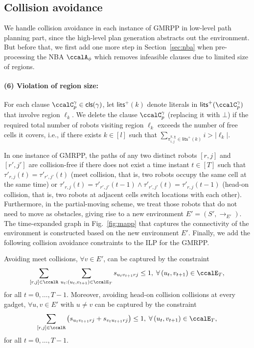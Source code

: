 \documentclass[Afour,sageh,times]{sagej}
\newcommand{\clause}[1]{\mathsf{cls}(#1)}
\newcommand{\cp}[2]{\ccalC_{#1}^{#2}}
\newcommand{\autop}{\ccalA_{\phi}}
\renewcommand{\ap}[3]{\mathcal{\pi}_{{#1},{#2}}^{#3}}
\begin{document}
{ \subsection{Collision avoidance}\label{sec:extension_collision}
We handle collision avoidance in each instance of GMRPP in low-level path planning part,  since the high-level plan generation abstracts out the environment.  But before that, we first add one more step in Section~\ref{sec:nba} when pre-processing the NBA $\autop$ which removes infeasible clauses due to limited size of regions.
\paragraph{(6) Violation of region size:} \label{prune:violation2} For each clause $\cp{p}{\gamma} \in \clause{\gamma}$, let $\mathsf{lits}^+(k)$ denote literals in $\mathsf{lits}^+(\cp{p}{\gamma})$ that involve region $\ell_{k}$. We delete the clause $\cp{p}{\gamma}$ (replacing it with $\bot$) if the required total number of robots  visiting region $\ell_{k}$ exceeds the number of free cells it covers, i.e., if there exists $k\in[l]$ such that $ \sum_{\ap{i}{j}{k,\chi}\in\mathsf{lits}^+(k)}   i > |\ell_k|$.

In one instance of GMRPP, the paths of  any two distinct robots $[r,j]$ and $[r', j']$ are collision-free if there does not exist  a time instant $t \in [T]$ such that $\tau'_{r,j}(t) = \tau'_{r',j'}(t)$ (meet collision, that is, two robots occupy the same cell at the same time) or  $\tau'_{r,j}(t) = \tau'_{r',j'}(t-1) \wedge \tau'_{r',j'}(t) = \tau'_{r,j}(t-1)$ (head-on collision, that is, two robots at adjacent cells switch locations with each other). Furthermore, in the partial-moving scheme, we treat those robots that do not need to move  as obstacles, giving rise to a new environment $E'=(S', \to_{E'})$. The time-expanded graph in Fig.~\ref{fig:mapp} that captures the connectivity of the environment is constructed based on the new environment $E'$. Finally, we add the following collision avoidance constraints to the ILP for the GMRPP.

Avoiding meet collisions,  $\forall v \in E'$, can be captured by the constraint
\begingroup\makeatletter\def\f@size{10}\check@mathfonts
\def\maketag@@@#1{\hbox{\m@th\normalsize\normalfont#1}}%
\begin{align}\label{eq:meet}
 \sum_{[r,j]\in\ccalR}  \, \sum_{u_t: (u_t, v_{t+1}) \in \ccalE_T} s_{u_t v_{t+1} r j } \leq 1,  \; \forall \,(u_t, v_{t+1}) \in \ccalE_T,
\end{align}
\endgroup
for all $t=0,\ldots,T-1$. Moreover, avoiding head-on collision collisions at every  gadget, $\forall u, v \in E'$ with $u\not= v$ can be captured by the constraint
\begingroup\makeatletter\def\f@size{10}\check@mathfonts
\def\maketag@@@#1{\hbox{\m@th\normalsize\normalfont#1}}%
\begingroup
\begin{align}\label{eq:headon}
 \sum_{[r,j]\in \ccalR} \left( s_{u_t v_{t+1} r j } + s_{v_t u_{t+1} r j } \right) \leq 1, \; \forall \,(u_t, v_{t+1}) \in \ccalE_T,
\end{align}
\endgroup
for all $t=0,\ldots,T-1$.

}
\end{document}

